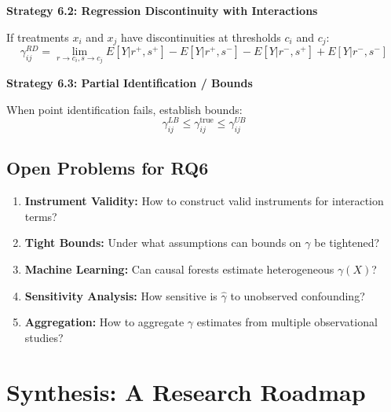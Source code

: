\textbf{Strategy 6.2: Regression Discontinuity with Interactions}

If treatments $x_i$ and $x_j$ have discontinuities at thresholds $c_i$ and $c_j$:
\begin{equation}
\gamma_{ij}^{RD} = \lim_{r \to c_i, s \to c_j} E[Y | r^+, s^+] - E[Y | r^+, s^-] - E[Y | r^-, s^+] + E[Y | r^-, s^-]
\end{equation}

\textbf{Strategy 6.3: Partial Identification / Bounds}

When point identification fails, establish bounds:
\begin{equation}
\gamma_{ij}^{LB} \leq \gamma_{ij}^{\text{true}} \leq \gamma_{ij}^{UB}
\end{equation}

\subsection{Open Problems for RQ6}

\begin{enumerate}
    \item \textbf{Instrument Validity:} How to construct valid instruments for interaction terms?

    \item \textbf{Tight Bounds:} Under what assumptions can bounds on $\gamma$ be tightened?

    \item \textbf{Machine Learning:} Can causal forests estimate heterogeneous $\gamma(X)$?

    \item \textbf{Sensitivity Analysis:} How sensitive is $\hat{\gamma}$ to unobserved confounding?

    \item \textbf{Aggregation:} How to aggregate $\gamma$ estimates from multiple observational studies?
\end{enumerate}

\section{Synthesis: A Research Roadmap}
\label{sec:roadmap}

